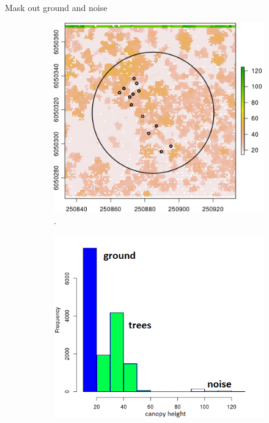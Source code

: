 \documentclass{subfiles}
\begin{document}
 \par Mask out  ground and noise
 \begin{figure} [h!]			
 	\begin{subfigure}[t]{.49\textwidth}
 		
 		\centering
 		\includegraphics[width=\textwidth]{img/dead/c4_height}
 		\caption{.}
 		\label{fig:c4_height}
 	\end{subfigure} \hfill
 	\begin{subfigure}[t]{.49\textwidth}
 		\centering
 		\includegraphics[width=\textwidth]{img/dead/c5_histHeight}

\end{subfigure}
\end{figure}
\end{document}
